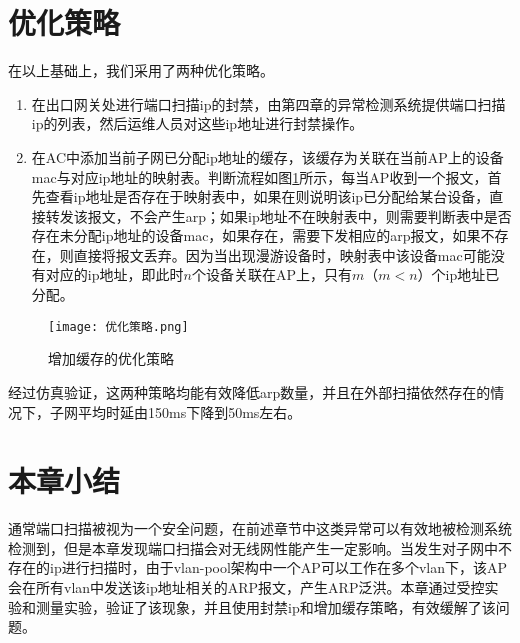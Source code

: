 \section{优化策略}
在以上基础上，我们采用了两种优化策略。
\begin{enumerate}
  \item 在出口网关处进行端口扫描ip的封禁，由第四章的异常检测系统提供端口扫描ip的列表，然后运维人员对这些ip地址进行封禁操作。
  \item 在AC中添加当前子网已分配ip地址的缓存，该缓存为关联在当前AP上的设备mac与对应ip地址的映射表。判断流程如图\ref{fig:优化策略}所示，每当AP收到一个报文，首先查看ip地址是否存在于映射表中，如果在则说明该ip已分配给某台设备，直接转发该报文，不会产生arp；如果ip地址不在映射表中，则需要判断表中是否存在未分配ip地址的设备mac，如果存在，需要下发相应的arp报文，如果不存在，则直接将报文丢弃。因为当出现漫游设备时，映射表中该设备mac可能没有对应的ip地址，即此时$n$个设备关联在AP上，只有$m$（$m<n$）个ip地址已分配。
\end{enumerate}
\begin{figure}
  \centering
  \texttt{[image: 优化策略.png]}
  \caption{增加缓存的优化策略}
  \label{fig:优化策略}
\end{figure}
经过仿真验证，这两种策略均能有效降低arp数量，并且在外部扫描依然存在的情况下，子网平均时延由150ms下降到50ms左右。


\section{本章小结}
通常端口扫描被视为一个安全问题，在前述章节中这类异常可以有效地被检测系统检测到，但是本章发现端口扫描会对无线网性能产生一定影响。当发生对子网中不存在的ip进行扫描时，由于vlan-pool架构中一个AP可以工作在多个vlan下，该AP会在所有vlan中发送该ip地址相关的ARP报文，产生ARP泛洪。本章通过受控实验和测量实验，验证了该现象，并且使用封禁ip和增加缓存策略，有效缓解了该问题。